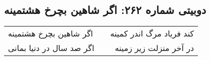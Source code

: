 \begin{center}
\section*{دوبیتی شماره ۲۶۲: اگر شاهین بچرخ هشتمینه}
\label{sec:262}
\begin{longtable}{l p{0.5cm} r}
اگر شاهین بچرخ هشتمینه
&&
کند فریاد مرگ اندر کمینه
\\
اگر صد سال در دنیا بمانی
&&
در آخر منزلت زیر زمینه
\\
\end{longtable}
\end{center}
